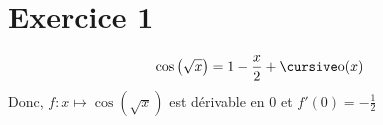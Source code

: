\part{Exercice 1}

\[
	\cos\left(\sqrt{x}\right) = 1 - \frac{x}{2} + \po(x)
\]
Donc, $f: x\mapsto \cos\left( \sqrt{x} \right)$ est dérivable en $0$ et $f'(0) = -\frac{1}{2}$
